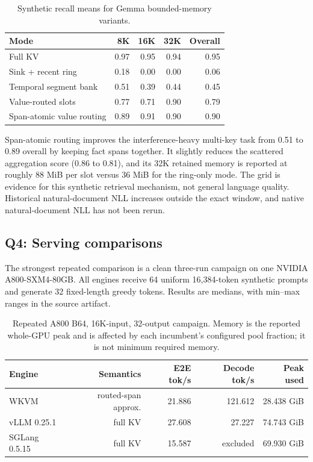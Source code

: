 \documentclass[10pt,letterpaper]{article}
\newcommand{\wkvm}{\textsc{WKVM}}
\begin{document}
\begin{table}[t]
\centering
\caption{Synthetic recall means for Gemma bounded-memory variants.}
\label{tab:quality}
\small
\begin{tabular}{@{}lrrrr@{}}
\toprule
Mode & 8K & 16K & 32K & Overall \\
\midrule
Full KV & 0.97 & 0.95 & 0.94 & 0.95 \\
Sink + recent ring & 0.18 & 0.00 & 0.00 & 0.06 \\
Temporal segment bank & 0.51 & 0.39 & 0.44 & 0.45 \\
Value-routed slots & 0.77 & 0.71 & 0.90 & 0.79 \\
Span-atomic value routing & 0.89 & 0.91 & 0.90 & 0.90 \\
\bottomrule
\end{tabular}
\end{table}

Span-atomic routing improves the interference-heavy multi-key task from 0.51
to 0.89 overall by keeping fact spans together.  It slightly reduces the
scattered aggregation score (0.86 to 0.81), and its 32K retained memory is
reported at roughly 88 MiB per slot versus 36 MiB for the ring-only mode.  The
grid is evidence for this synthetic retrieval mechanism, not general language
quality.  Historical natural-document NLL increases outside the exact window,
and native natural-document NLL has not been rerun.

\subsection{Q4: Serving comparisons}

The strongest repeated comparison is a clean three-run campaign on one
NVIDIA A800-SXM4-80GB.  All engines receive 64 uniform 16,384-token synthetic
prompts and generate 32 fixed-length greedy tokens.  Results are medians, with
min--max ranges in the source artifact.

\begin{table}[t]
\centering
\caption{Repeated A800 B64, 16K-input, 32-output campaign.  Memory is the
reported whole-GPU peak and is affected by each incumbent's configured pool
fraction; it is not minimum required memory.}
\label{tab:a800}
\small
\begin{tabular}{@{}lrrrr@{}}
\toprule
Engine & Semantics & E2E tok/s & Decode tok/s & Peak used \\
\midrule
\wkvm{} & routed-span approx. & 21.886 & 121.612 & 28.438 GiB \\
vLLM 0.25.1 & full KV & 27.608 & 27.227 & 74.743 GiB \\
SGLang 0.5.15 & full KV & 15.587 & excluded & 69.930 GiB \\
\bottomrule
\end{tabular}
\end{table}
\end{document}
